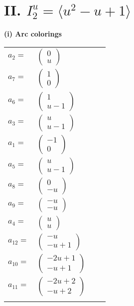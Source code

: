 \documentclass[1p]{elsarticle_modified}
\theoremstyle{definition}
\begin{document}
\centering \section*{II. $I^u_{2}= \langle u^2- u+1 \rangle$}
\flushleft \textbf{(i) Arc colorings}\\
\begin{tabular}{m{7pt} m{180pt} m{7pt} m{180pt} }
\flushright $a_{2}=$&$\begin{pmatrix}0\\u\end{pmatrix}$ \\
\flushright $a_{7}=$&$\begin{pmatrix}1\\0\end{pmatrix}$ \\
\flushright $a_{6}=$&$\begin{pmatrix}1\\u-1\end{pmatrix}$ \\
\flushright $a_{3}=$&$\begin{pmatrix}u\\u-1\end{pmatrix}$ \\
\flushright $a_{1}=$&$\begin{pmatrix}-1\\0\end{pmatrix}$ \\
\flushright $a_{5}=$&$\begin{pmatrix}u\\u-1\end{pmatrix}$ \\
\flushright $a_{8}=$&$\begin{pmatrix}0\\- u\end{pmatrix}$ \\
\flushright $a_{9}=$&$\begin{pmatrix}- u\\- u\end{pmatrix}$ \\
\flushright $a_{4}=$&$\begin{pmatrix}u\\u\end{pmatrix}$ \\
\flushright $a_{12}=$&$\begin{pmatrix}- u\\- u+1\end{pmatrix}$ \\
\flushright $a_{10}=$&$\begin{pmatrix}-2 u+1\\- u+1\end{pmatrix}$ \\
\flushright $a_{11}=$&$\begin{pmatrix}-2 u+2\\- u+2\end{pmatrix}$\\&\end{tabular}
\end{document}
